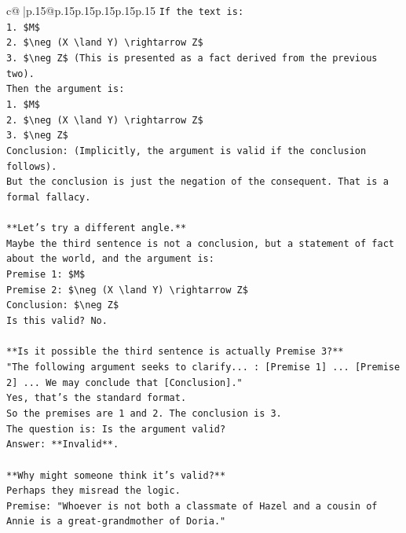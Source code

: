 \documentclass{article}
\begin{document}
{\begin{supertabular}{c@{$\;$}|p{.15\linewidth}@{}p{.15\linewidth}p{.15\linewidth}p{.15\linewidth}p{.15\linewidth}p{.15\linewidth}}
{{{\texttt{If the text is:} \\
\texttt{1. \$M\$} \\
\texttt{2. \$\textbackslash{}neg (X \textbackslash{}land Y) \textbackslash{}rightarrow Z\$} \\
\texttt{3. \$\textbackslash{}neg Z\$ (This is presented as a fact derived from the previous two).} \\
\texttt{Then the argument is:} \\
\texttt{1. \$M\$} \\
\texttt{2. \$\textbackslash{}neg (X \textbackslash{}land Y) \textbackslash{}rightarrow Z\$} \\
\texttt{3. \$\textbackslash{}neg Z\$} \\
\texttt{Conclusion: (Implicitly, the argument is valid if the conclusion follows).} \\
\texttt{But the conclusion is just the negation of the consequent. That is a formal fallacy.} \\
\\ 
\texttt{**Let's try a different angle.**} \\
\texttt{Maybe the third sentence is not a conclusion, but a statement of fact about the world, and the argument is:} \\
\texttt{Premise 1: \$M\$} \\
\texttt{Premise 2: \$\textbackslash{}neg (X \textbackslash{}land Y) \textbackslash{}rightarrow Z\$} \\
\texttt{Conclusion: \$\textbackslash{}neg Z\$} \\
\texttt{Is this valid? No.} \\
\\ 
\texttt{**Is it possible the third sentence is actually Premise 3?**} \\
\texttt{"The following argument seeks to clarify... : {[}Premise 1{]} ... {[}Premise 2{]} ... We may conclude that {[}Conclusion{]}."} \\
\texttt{Yes, that's the standard format.} \\
\texttt{So the premises are 1 and 2. The conclusion is 3.} \\
\texttt{The question is: Is the argument valid?} \\
\texttt{Answer: **Invalid**.} \\
\\ 
\texttt{**Why might someone think it's valid?**} \\
\texttt{Perhaps they misread the logic.} \\
\texttt{Premise: "Whoever is not both a classmate of Hazel and a cousin of Annie is a great{-}grandmother of Doria."} \\
}}}
\end{supertabular}}
\end{document}
